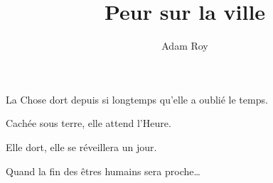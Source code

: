 \documentclass[a5paper]{report}
\author{Adam Roy}
\title{Peur sur la ville}
\begin{document}
\maketitle

La Chose dort depuis si longtemps qu'elle a oublié le temps.

Cachée sous terre, elle attend l'Heure.

Elle dort, elle se réveillera un jour.

Quand la fin des êtres humains sera proche\ldots{}




\end{document}
